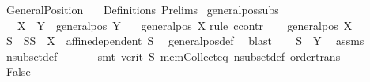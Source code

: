 %
\begin{isabellebody}%
%
%
\isadelimtheory
%
\endisadelimtheory
%
\isatagtheory
{}\isamarkupfalse%
\ GeneralPosition{}\isanewline
\ \ \ Definitions\ Prelims\isanewline
\isanewline
{}%
\endisatagtheory
{\isafoldtheory}%
%
\isadelimtheory
\isanewline
%
\endisadelimtheory
{}\isamarkupfalse%
\ general{\isacharunderscore}{\kern0pt}pos{\isacharunderscore}{\kern0pt}subs{\isacharcolon}{\kern0pt}\isanewline
\ \ \ {\isachardoublequoteopen}X\ {\isasymsubseteq}\ Y{\isachardoublequoteclose}\ \ {\isachardoublequoteopen}general{\isacharunderscore}{\kern0pt}pos\ Y{\isachardoublequoteclose}\isanewline
\ \ \ {\isachardoublequoteopen}general{\isacharunderscore}{\kern0pt}pos\ X{\isachardoublequoteclose}\isanewline
%
\isadelimproof
%
\endisadelimproof
%
\isatagproof
{}\isamarkupfalse%
{\isacharparenleft}{\kern0pt}rule\ ccontr{\isacharparenright}{\kern0pt}\isanewline
\ \ \isamarkupfalse%
\ {\isachardoublequoteopen}{\isasymnot}general{\isacharunderscore}{\kern0pt}pos\ X{\isachardoublequoteclose}\isanewline
\ \ \isamarkupfalse%
\ \isamarkupfalse%
\ S\ \ S{\isacharcolon}{\kern0pt}{\isachardoublequoteopen}S\ {\isasymin}\ X{\isachartilde}{\kern0pt}\ {}{\isachardoublequoteclose}\ {\isachardoublequoteopen}affine{\isacharunderscore}{\kern0pt}dependent\ S{\isachardoublequoteclose}\ \isamarkupfalse%
\ general{\isacharunderscore}{\kern0pt}pos{\isacharunderscore}{\kern0pt}def\ \isamarkupfalse%
\ blast\isanewline
\ \ \isamarkupfalse%
\ {\isachardoublequoteopen}S\ {\isasymin}\ Y{\isachartilde}{\kern0pt}{}{\isachardoublequoteclose}\ \isamarkupfalse%
\ assms{\isacharparenleft}{\kern0pt}{}{\isacharparenright}{\kern0pt}\ \isamarkupfalse%
\ nsubset{\isacharunderscore}{\kern0pt}def\ \isanewline
\ \ \ \ \isamarkupfalse%
\ {\isacharparenleft}{\kern0pt}smt\ {\isacharparenleft}{\kern0pt}verit{\isacharparenright}{\kern0pt}\ S\ mem{\isacharunderscore}{\kern0pt}Collect{\isacharunderscore}{\kern0pt}eq\ nsubset{\isacharunderscore}{\kern0pt}def\ order{\isacharunderscore}{\kern0pt}trans{\isacharparenright}{\kern0pt}\ \ \isanewline
\ \ \isamarkupfalse%
\ False\ \isamarkupfalse%

\end{isabellebody}
